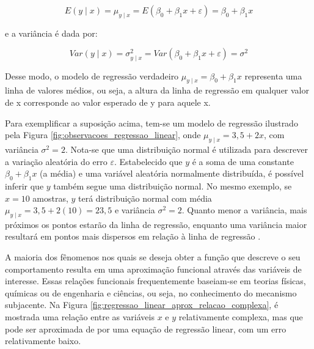 \begin{equation}
	E(y \mid x) = \mu_{y \mid x} = E(\beta_0 + \beta_1x + \varepsilon) = \beta_0 + \beta_1x
\end{equation}

e a variância é dada por:

\begin{equation}
	Var (y \mid x) = \sigma_{y \mid x}^2 = Var(\beta_0 + \beta_1x + \varepsilon) = \sigma^2
\end{equation}

Desse modo, o modelo de regressão verdadeiro $\mu_{y \mid x} = \beta_0 + \beta_1x$ representa uma linha de valores médios, ou seja, a altura da linha de regressão em qualquer valor de x corresponde ao valor esperado de y para aquele x.

Para exemplificar a suposição acima, tem-se um modelo de regressão ilustrado pela Figura \ref{fig:observacoes_regressao_linear}, onde $\mu_{y \mid x} = 3,5 + 2x$, com variância $\sigma^2 = 2$. Nota-se que uma distribuição normal é utilizada para descrever a variação aleatória do erro $\varepsilon$. Estabelecido que $y$ é a soma de uma constante $\beta_0 + \beta_1x$ (a média) e uma variável aleatória normalmente distribuída, é possível inferir que $y$ também segue uma distribuição normal. No mesmo exemplo, se $x = 10$ amostras, $y$ terá distribuição normal com média $\mu_{y \mid x} = 3,5 + 2(10) = 23,5$ e variância $\sigma^2 = 2$. Quanto menor a variância, mais próximos os pontos estarão da linha de regressão, enquanto uma variância maior resultará em pontos mais dispersos em relação à linha de regressão \cite{montgomery2012}.

A maioria dos fênomenos nos quais se deseja obter a função que descreve o seu comportamento resulta em uma aproximação funcional através das variáveis de interesse. Essas relações funcionais frequentemente baseiam-se em teorias físicas, químicas ou de engenharia e ciências, ou seja, no conhecimento do mecanismo subjacente. Na Figura \ref{fig:regressao_linear_aprox_relacao_complexa}, é mostrada uma relação entre as variáveis $x$ e $y$ relativamente complexa, mas que pode ser aproximada de por uma equação de regressão linear, com um erro relativamente baixo.

